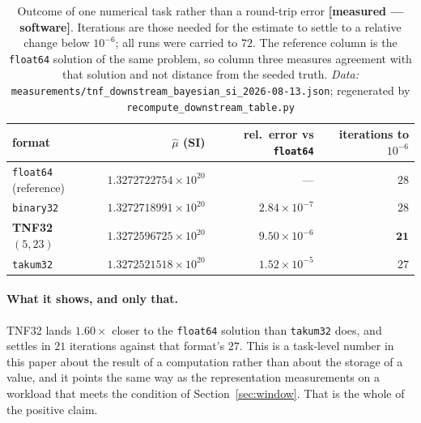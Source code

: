 \documentclass[11pt]{article}
\theoremstyle{definition}
\begin{document}
\begin{table}[t]\centering
\caption{Outcome of one numerical task rather than a round-trip error
\textbf{[measured --- software]}. Iterations are those needed for the estimate to
settle to a relative change below $10^{-6}$; all runs were carried to $72$.
The reference column is the \texttt{float64} solution of the same problem, so
column three measures agreement with that solution and not distance from the
seeded truth. \emph{Data:} \texttt{measurements/tnf\_downstream\_bayesian\_si\_2026-08-13.json}; regenerated by \texttt{recompute\_downstream\_table.py}}
\label{tab:downstream}
\begin{tabular}{lrrr}
\toprule
format & $\hat\mu$ (SI) & rel.\ error vs \texttt{float64} & iterations to $10^{-6}$ \\
\midrule
\texttt{float64} (reference) & $1.3272722754\times 10^{20}$ & --- & $28$ \\
\texttt{binary32}            & $1.3272718991\times 10^{20}$ & $2.84\times 10^{-7}$ & $28$ \\
\textbf{TNF32 $(5,23)$}      & $1.3272596725\times 10^{20}$ & $9.50\times 10^{-6}$ & $\mathbf{21}$ \\
\texttt{takum32}             & $1.3272521518\times 10^{20}$ & $1.52\times 10^{-5}$ & $27$ \\
\bottomrule
\end{tabular}
\end{table}

\paragraph{What it shows, and only that.} TNF32 lands $1.60\times$ closer to the
\texttt{float64} solution than \texttt{takum32} does, and settles in $21$
iterations against that format's $27$. This is a task-level number in this paper
about the result of a computation rather than about the storage of a value, and it
points the same way as the representation measurements on a workload that meets
the condition of Section~\ref{sec:window}. That is the whole of the positive
claim.
\end{document}
